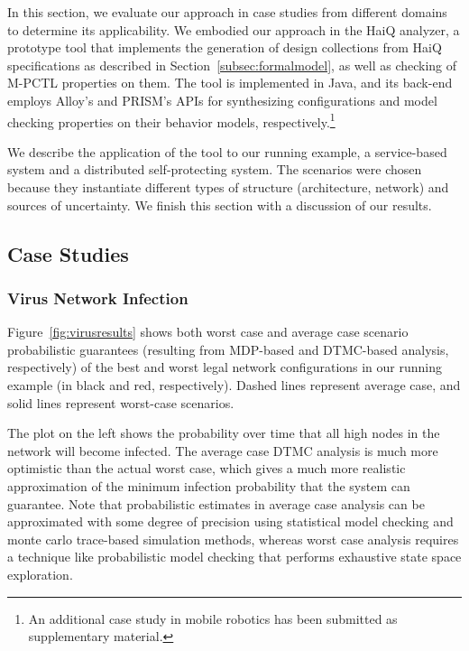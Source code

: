 \documentclass[10pt,journal,compsoc]{IEEEtran}
\begin{document}
In this section, we evaluate our approach in case studies from different domains to determine its applicability. 
We embodied our approach in the {\sf HaiQ} analyzer, a prototype tool that implements the generation of design collections from {\sf HaiQ} specifications as described in Section~\ref{subsec:formalmodel}, as well as checking of M-PCTL properties on them.
The tool is implemented in Java, and its back-end employs Alloy's and PRISM's APIs for synthesizing configurations and model checking properties on their behavior models, respectively.\footnote{An additional case study in mobile robotics has been submitted as supplementary material.}
 

We describe the application of the tool to our running example, a service-based system and a distributed self-protecting system. 
The scenarios were chosen because they instantiate different types of structure (architecture, network) and sources of uncertainty. 
We finish this section with a discussion of our results.


\subsection{Case Studies}

\subsubsection{Virus Network Infection}

Figure~\ref{fig:virusresults} shows both worst case and average case scenario probabilistic guarantees (resulting from MDP-based and DTMC-based analysis, respectively) of the best and worst legal network configurations in our running example (in black and red, respectively). Dashed lines represent average case, and solid lines represent worst-case scenarios. 

The plot on the left shows the probability over time that all high nodes in the network will become infected. The average case DTMC analysis is much more optimistic than the actual worst case, which gives a much more realistic approximation of the minimum infection probability that the system can guarantee. Note that probabilistic estimates in average case analysis can be approximated with some degree of precision using statistical model checking and monte carlo trace-based simulation methods, whereas worst case analysis requires a technique like probabilistic model checking that performs exhaustive state space exploration.
\end{document}
